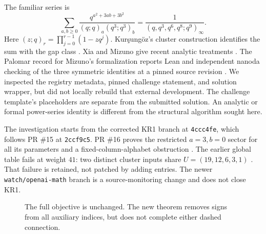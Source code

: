 \documentclass[11pt,a4paper]{article}
\theoremstyle{definition}
\renewcommand{\AA}{\mathcal A}
\newcommand{\BB}{\mathcal B}
\begin{document}
The familiar series is
\begin{equation}\label{eq:kr1}
\sum_{a,b\ge0}\frac{q^{a^2+3ab+3b^2}}
 {(q;q)_a(q^3;q^3)_b}
=\frac1{(q,q^3,q^6,q^8;q^9)_\infty}.
\end{equation}
Here $(z;q)_r=\prod_{j=0}^{r-1}(1-zq^j)$. Kur\c{s}ung\"oz's
cluster construction identifies the sum with the gap class \cite{kursungoz}.
Xia and Mizuno give recent analytic treatments \cite{xia,mizuno}.
The Palomar record for Mizuno's formalization reports Lean and independent
nanoda checking of the three symmetric identities at a pinned source revision
\cite{palomar}. We inspected the registry metadata, pinned challenge statement,
and solution wrapper, but did not locally rebuild that external development.
The challenge template's placeholders are separate from the submitted solution.
An analytic or formal power-series identity is different
from the structural algorithm sought here.

The investigation starts from the corrected KR1 branch at
\texttt{4ccc4fe}, which follows PR \#15 at \texttt{2ccf9c5}.
PR \#16 proves the restricted $a=3,b=0$ sector for all its parameters and a
fixed-column-alphabet obstruction \cite{repo16}. The earlier global table
fails at weight $41$: two distinct cluster inputs share
$U=(19,12,6,3,1)$ \cite{repo15}. That failure is retained, not patched by
adding entries. The newer \texttt{watch/openai-math} branch is a source-monitoring
change and does not close KR1.

\begin{figure}[ht]
\centering
{}
\caption{The full objective is unchanged. The new theorem removes signs from
all auxiliary indices, but does not complete either dashed connection.}
\end{figure}
\end{document}
